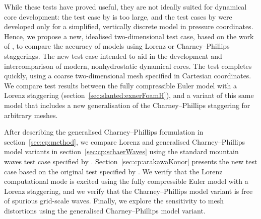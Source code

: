 While these tests have proved useful, they are not ideally suited for dynamical core development: the test case by \citet{untch-hortal2004} is too large, and the test cases by \citet{arakawa-konor1996} were developed only for a simplified, vertically discrete model in pressure coordinates.
Hence, we propose a new, idealised two-dimensional test case, based on the work of \citet{arakawa-konor1996}, to compare the accuracy of models using Lorenz or Charney--Phillips staggerings.
The new test case intended to aid in the development and intercomparison of modern, nonhydrostatic dynamical cores.  The test completes quickly, using a coarse two-dimensional mesh specified in Cartesian coordinates.
We compare test results between the fully compressible Euler model with a Lorenz staggering (section~\ref{sec:slanted:exnerFoamH}), and a variant of this same model that includes a new generalisation of the Charney--Phillips staggering for arbitrary meshes.

After describing the generalised Charney--Phillips formulation in section~\ref{sec:cp:method}, we compare Lorenz and generalised Charney--Phillips model variants in section~\ref{sec:cp:schaerWaves} using the standard mountain waves test case specified by \citet{schaer2002}.
Section~\ref{sec:cp:arakawaKonor} presents the new test case based on the original test specified by \citet{arakawa-konor1996}.
We verify that the Lorenz computational mode is excited using the fully compressible Euler model with a Lorenz staggering, and we verify that the Charney--Phillips model variant is free of spurious grid-scale waves.  Finally, we explore the sensitivity to mesh distortions using the generalised Charney--Phillips model variant.





